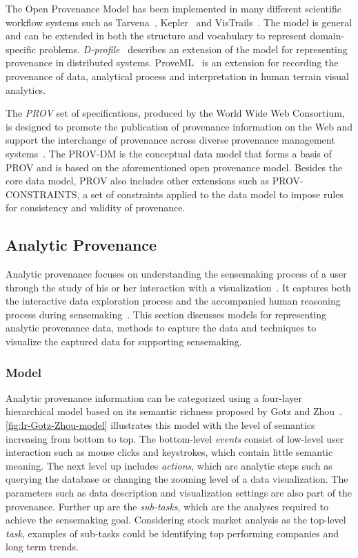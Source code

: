 The Open Provenance Model has been implemented in many different scientific workflow systems such as Tarvena~\cite{Zhao2008}, Kepler~\cite{Bowers2006} and VisTrails~\cite{Bavoil2005}. The model is general and can be extended in both the structure and vocabulary to represent domain-specific problems. \emph{D-profile}~\cite{Groth2011} describes an extension of the model for representing provenance in distributed systems. ProveML~\cite{Walker2013} is an extension for recording the provenance of data, analytical process and interpretation in human terrain visual analytics.

The \emph{PROV} set of specifications, produced by the World Wide Web Consortium, is designed to promote the publication of provenance information on the Web and support the interchange of provenance across diverse provenance management systems~\cite{Missier2013}. The PROV-DM is the conceptual data model that forms a basis of PROV and is based on the aforementioned open provenance model. Besides the core data model, PROV also includes other extensions such as PROV-CONSTRAINTS, a set of constraints applied to the data model to impose rules for consistency and validity of provenance.

\subsection{Analytic Provenance}
\label{sec:lr-analytic-provenance}
Analytic provenance focuses on understanding the sensemaking process of a user through the study of his or her interaction with a visualization~\cite{North2011}. It captures both the interactive data exploration process and the accompanied human reasoning process during sensemaking~\cite{Xu2015}. This section discusses models for representing analytic provenance data, methods to capture the data and techniques to visualize the captured data for supporting sensemaking.

\subsubsection{Model}
\label{sec:lr-analytic-provenance-model}
Analytic provenance information can be categorized using a four-layer hierarchical model based on its semantic richness proposed by Gotz and Zhou~\cite{Gotz2009}. \autoref{fig:lr-Gotz-Zhou-model} illustrates this model with the level of semantics increasing from bottom to top. The bottom-level \emph{events} consist of low-level user interaction such as mouse clicks and keystrokes, which contain little semantic meaning. The next level up includes \emph{actions}, which are analytic steps such as querying the database or changing the zooming level of a data visualization. The parameters such as data description and visualization settings are also part of the provenance. Further up are the \emph{sub-tasks}, which are the analyses required to achieve the sensemaking goal. Considering stock market analysis as the top-level \emph{task}, examples of sub-tasks could be identifying top performing companies and long term trends.

